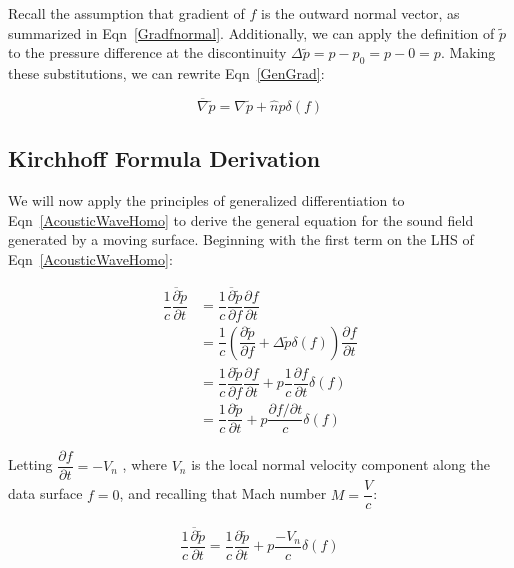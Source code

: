 \documentclass[]{aiaa-tc}%
\begin{document}
Recall the assumption that gradient of $f$ is the outward normal vector, as summarized in Eqn~\ref{Gradfnormal}.  Additionally, we can apply the definition of $\widetilde{p}$ to the pressure difference at the discontinuity $\Delta\widetilde{p} = p - p_0 = p - 0 = p$.  Making these substitutions, we can rewrite Eqn~\ref{GenGrad}:

\begin{equation} \label{GenGradAssume}
\overline{\nabla} \widetilde{p}
= \nabla\widetilde{p} + \hat{n} p \delta(f)
\end{equation}


\subsection{Kirchhoff Formula Derivation}

We will now apply the principles of generalized differentiation to Eqn~\ref{AcousticWaveHomo} to derive the general equation for the sound field generated by a moving surface.  Beginning with the first term on the LHS of Eqn~\ref{AcousticWaveHomo}:

\begin{align*}
\dfrac{1}{c}\dfrac{\overline{\partial}\widetilde{p}}{\partial t}
&= \dfrac{1}{c}\dfrac{\overline{\partial}\widetilde{p}}{\partial f}
    \dfrac{\partial f}{\partial t} \\
&= \dfrac{1}{c}\left( \dfrac{\partial\widetilde{p}}{\partial f}
    + \Delta \widetilde{p} \delta(f) \right)
    \dfrac{\partial f}{\partial t} \\
&= \dfrac{1}{c}\dfrac{\partial\widetilde{p}}{\partial f} \dfrac{\partial f}{\partial t}
    + p \dfrac{1}{c}\dfrac{\partial f}{\partial t} \delta(f) \\
&= \dfrac{1}{c}\dfrac{\partial\widetilde{p}}{\partial t}
    + p \dfrac{\partial f / \partial t}{c} \delta(f)
\end{align*}

\noindent \color{red} Letting $\dfrac{\partial f}{\partial t} = -V_n$ \color{black}, where $V_n$ is the local normal velocity component along the data surface $f=0$, and recalling that Mach number $M = \dfrac{V}{c}$:

\begin{align*}
\dfrac{1}{c}\dfrac{\overline{\partial}\widetilde{p}}{\partial t}
= \dfrac{1}{c}\dfrac{\partial\widetilde{p}}{\partial t}
    + p \dfrac{-V_n}{c} \delta(f)
\end{align*}
\end{document}
